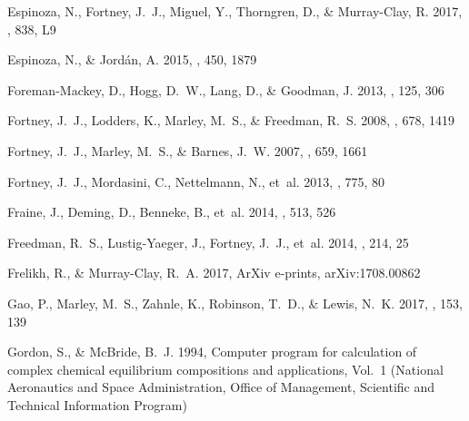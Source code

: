 \documentclass[twocolumn, trackchanges]{aastex61}
\begin{document}
\begin{thebibliography}{}
{Espinoza}, N., {Fortney}, J.~J., {Miguel}, Y., {Thorngren}, D., \&
  {Murray-Clay}, R. 2017, \apjl, 838, L9

{Espinoza}, N., \& {Jord{\'a}n}, A. 2015, \mnras, 450, 1879

{Foreman-Mackey}, D., {Hogg}, D.~W., {Lang}, D., \& {Goodman}, J. 2013, \pasp,
  125, 306

{Fortney}, J.~J., {Lodders}, K., {Marley}, M.~S., \& {Freedman}, R.~S. 2008,
  \apj, 678, 1419

{Fortney}, J.~J., {Marley}, M.~S., \& {Barnes}, J.~W. 2007, \apj, 659, 1661

{Fortney}, J.~J., {Mordasini}, C., {Nettelmann}, N., {et~al.} 2013, \apj, 775,
  80

{Fraine}, J., {Deming}, D., {Benneke}, B., {et~al.} 2014, \nat, 513, 526

{Freedman}, R.~S., {Lustig-Yaeger}, J., {Fortney}, J.~J., {et~al.} 2014, \apjs,
  214, 25

{Frelikh}, R., \& {Murray-Clay}, R.~A. 2017, ArXiv e-prints, arXiv:1708.00862

{Gao}, P., {Marley}, M.~S., {Zahnle}, K., {Robinson}, T.~D., \& {Lewis}, N.~K.
  2017, \aj, 153, 139

Gordon, S., \& McBride, B.~J. 1994, Computer program for calculation of complex
  chemical equilibrium compositions and applications, Vol.~1 (National
  Aeronautics and Space Administration, Office of Management, Scientific and
  Technical Information Program)


\end{thebibliography}
\end{document}
